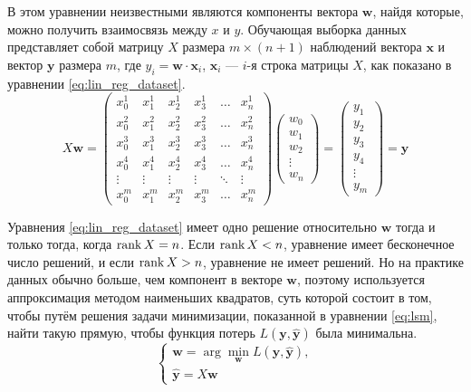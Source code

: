 В этом уравнении неизвестными являются компоненты вектора $\mathbf{w}$, найдя которые, можно получить взаимосвязь между $x$ и $y$. Обучающая выборка данных представляет собой матрицу $X$ размера $m \times (n+1)$ наблюдений вектора $\mathbf{x}$ и вектор $\mathbf{y}$ размера $m$, где $y_i=\mathbf{w} \cdot \mathbf{x}_i$, $\mathbf{x}_i$ --- $i$-я строка матрицы $X$, как показано в уравнении \ref*{eq:lin_reg_dataset}.
\begin{equation}
    \label{eq:lin_reg_dataset}
    X\mathbf{w}=
    \left(\begin{matrix}
        x_0^1 & x_1^1 & x_2^1 & x_3^1 & \dots & x_n^1 \\
        x_0^2 & x_1^2 & x_2^2 & x_3^2 & \dots & x_n^2 \\
        x_0^3 & x_1^3 & x_2^3 & x_3^3 & \dots & x_n^3 \\
        x_0^4 & x_1^4 & x_2^4 & x_3^4 & \dots & x_n^4 \\
        \vdots & \vdots & \vdots & \vdots & \ddots & \vdots \\
        x_0^m & x_1^m & x_2^m & x_3^m & \dots & x_n^m
    \end{matrix}\right)
    \left(\begin{matrix}
        w_0 \\
        w_1 \\
        w_2 \\
        \vdots \\
        w_n
    \end{matrix}\right)=
    \left(\begin{matrix}
        y_1 \\
        y_2 \\
        y_3 \\
        y_4 \\
        \vdots \\
        y_m
    \end{matrix}\right)=\mathbf{y}
\end{equation}

Уравнения \ref*{eq:lin_reg_dataset} имеет одно решение относительно $\mathbf{w}$ тогда и только тогда, когда $\operatorname{rank} X = n$. Если $\operatorname{rank} X < n$, уравнение имеет бесконечное число решений, и если $\operatorname{rank} X > n$, уравнение не имеет решений. Но на практике данных обычно больше, чем компонент в векторе $\mathbf{w}$, поэтому используется аппроксимация методом наименьших квадратов, суть которой состоит в том, чтобы путём решения задачи минимизации, показанной в уравнении \ref*{eq:lsm}, найти такую прямую, чтобы функция потерь $L(\mathbf{y},\hat{\mathbf{y}})$ была минимальна.
\begin{equation}
    \label{eq:lsm}
    \begin{cases}
        \mathbf{w} = \arg\min\limits_\mathbf{w} L(\mathbf{y},\hat{\mathbf{y}}), \\
        \hat{\mathbf{y}}=X\mathbf{w}
    \end{cases}
\end{equation}

